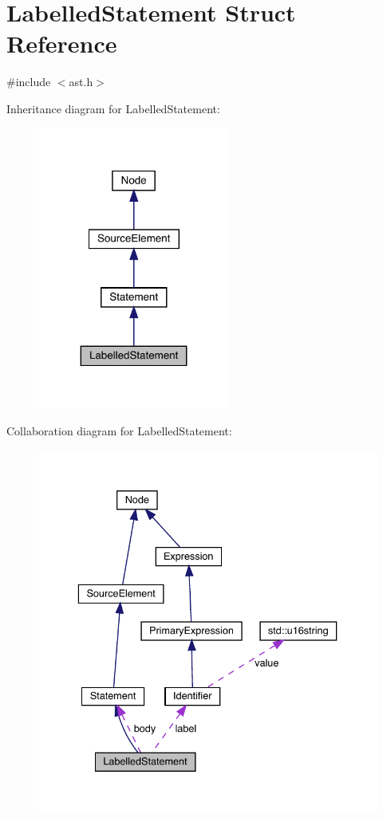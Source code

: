\hypertarget{struct_labelled_statement}{}\section{Labelled\+Statement Struct Reference}
\label{struct_labelled_statement}


{\ttfamily \#include $<$ast.\+h$>$}



Inheritance diagram for Labelled\+Statement\+:
\nopagebreak
\begin{figure}[H]
\begin{center}
\leavevmode
\includegraphics[width=179pt]{struct_labelled_statement__inherit__graph}
\end{center}
\end{figure}


Collaboration diagram for Labelled\+Statement\+:
\nopagebreak
\begin{figure}[H]
\begin{center}
\leavevmode
\includegraphics[width=336pt]{struct_labelled_statement__coll__graph}
\end{center}
\end{figure}
